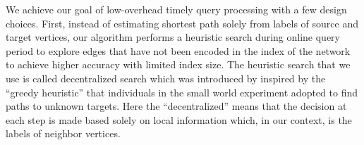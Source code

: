 %
%


We achieve our goal of low-overhead timely query processing with a few design choices. First, instead of estimating shortest path solely from labels of source and target vertices, our algorithm performs a heuristic search during online query period to explore edges that have not been encoded in the index of the network to achieve higher accuracy with limited index size. The heuristic search that we use is called decentralized search which was introduced by \cite{Kleinberg:2000p5066} inspired by the ``greedy heuristic'' that individuals in the small world experiment adopted to find paths to unknown targets. Here the ``decentralized'' means that the decision at each step is made based solely on local information which, in our context, is the labels of neighbor vertices.

